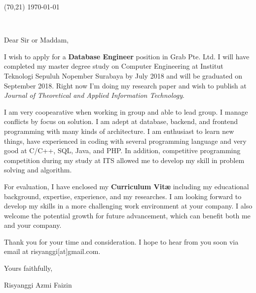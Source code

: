 \documentclass[letterpaper]{deedy-resume} %
\begin{document}
\begin{textblock}{25}(70,21)
\color{date}\fontsize{8pt}{10pt}\selectfont
\today
\end{textblock}


\begin{minipage}[t]{0.08\textwidth} %
\ 
\end{minipage}
\hfill

\begin{minipage}[t]{0.7\textwidth}

\sectionspace
\sectionspace
\sectionspace
{}
\sectionspace
\sectionspace
\sectionspace

Dear Sir or Maddam,
\sectionspace

I wish to apply for a \textbf{Database Engineer} position in Grab Pte. Ltd. I will have completed my master degree study on Computer Engineering at Institut Teknologi Sepuluh Nopember Surabaya by July 2018 and will be graduated on September 2018. Right now I'm doing my research paper and wish to publish at \textit{Journal of Theoretical and Applied Information Technology}.\sectionspace

I am very coopearative when working in group and able to lead group. I manage conflicts by focus on solution. I am adept at database, backend, and frontend programming with many kinds of architecture. I am enthusiast to learn new things, have experienced in coding with several programming language and very good at C/C++, SQL, Java, and PHP. In addition, competitive programming competition during my study at ITS allowed me to develop my skill in problem solving and algorithm.
\sectionspace

For evaluation, I have enclosed my \textbf{Curriculum Vitæ} including my educational background, expertise, experience, and my researches. I am looking forward to develop my skills in a more challenging work environment at your company. I also welcome the potential growth for future advancement, which can benefit both me and your company.
\sectionspace

Thank you for your time and consideration. I hope to hear from you soon via email at risyanggi[at]gmail.com.\sectionspace

\sectionspace
\sectionspace
\sectionspace
\sectionspace
\sectionspace

Yours faithfully,
\sectionspace
\sectionspace
\sectionspace

Risyanggi Azmi Faizin
\end{minipage} %
\end{document}
